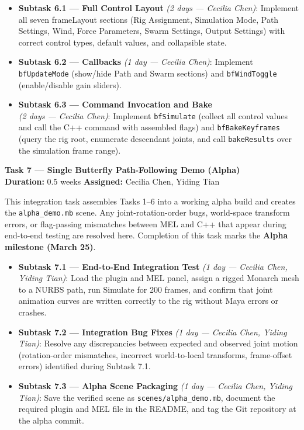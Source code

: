 \documentclass[12pt]{article}
\begin{document}
\begin{itemize}
  \item \textbf{Subtask 6.1 --- Full Control Layout} \textit{(2 days --- Cecilia Chen)}: Implement all seven
    frameLayout sections (Rig Assignment, Simulation Mode, Path
    Settings, Wind, Force Parameters, Swarm Settings, Output Settings) with correct
    control types, default values, and collapsible state.
  \item \textbf{Subtask 6.2 --- Callbacks} \textit{(1 day --- Cecilia Chen)}:
    Implement \texttt{bfUpdateMode}
    (show/hide Path and Swarm sections) and \texttt{bfWindToggle}
    (enable/disable gain sliders).
  \item \textbf{Subtask 6.3 --- Command Invocation and Bake}\\
    \textit{(2 days --- Cecilia Chen)}: Implement
    \texttt{bfSimulate} (collect all control values and call the C++ command with
    assembled flags) and \texttt{bfBakeKeyframes} (query the rig root, enumerate
    descendant joints, and call \texttt{bakeResults} over the simulation frame
    range).
\end{itemize}

\bigskip
\noindent\textbf{Task 7 --- Single Butterfly Path-Following Demo (Alpha)}\\
\textbf{Duration:} 0.5 weeks \quad \textbf{Assigned:} Cecilia Chen, Yiding Tian

This integration task assembles Tasks 1--6 into a working alpha build and creates
the \texttt{alpha\_demo.mb} scene. Any joint-rotation-order bugs, world-space
transform errors, or flag-passing mismatches between MEL and C++ that appear during
end-to-end testing are resolved here. Completion of this task marks the
\textbf{Alpha milestone (March 25)}.

\begin{itemize}
  \item \textbf{Subtask 7.1 --- End-to-End Integration Test} \textit{(1 day --- Cecilia Chen, Yiding Tian)}: Load the plugin and
    MEL panel, assign a rigged Monarch mesh to a NURBS path, run Simulate for
    200 frames, and confirm that joint animation curves are written correctly to the
    rig without Maya errors or crashes.
  \item \textbf{Subtask 7.2 --- Integration Bug Fixes} \textit{(1 day --- Cecilia Chen, Yiding Tian)}: Resolve any discrepancies
    between expected and observed joint motion (rotation-order mismatches, incorrect
    world-to-local transforms, frame-offset errors) identified during Subtask 7.1.
  \item \textbf{Subtask 7.3 --- Alpha Scene Packaging} \textit{(1 day --- Cecilia Chen, Yiding Tian)}: Save the verified scene as
    \texttt{scenes/alpha\_demo.mb}, document the required plugin and MEL file in the
    README, and tag the Git repository at the alpha commit.
\end{itemize}
\end{document}
